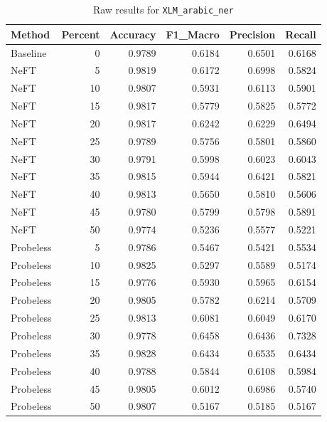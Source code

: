 \documentclass[12pt]{article}
\begin{document}
\begin{table}[H]
\centering
\caption{Raw results for \texttt{XLM\_arabic\_ner}}
\label{tab:xlm-arabic-ner}
\begin{tabular}{lrrrrr}
\toprule
Method & Percent & Accuracy & F1\_Macro & Precision & Recall \\
\midrule
Baseline & 0 & 0.9789 & 0.6184 & 0.6501 & 0.6168 \\
NeFT & 5 & 0.9819 & 0.6172 & 0.6998 & 0.5824 \\
NeFT & 10 & 0.9807 & 0.5931 & 0.6113 & 0.5901 \\
NeFT & 15 & 0.9817 & 0.5779 & 0.5825 & 0.5772 \\
NeFT & 20 & 0.9817 & 0.6242 & 0.6229 & 0.6494 \\
NeFT & 25 & 0.9789 & 0.5756 & 0.5801 & 0.5860 \\
NeFT & 30 & 0.9791 & 0.5998 & 0.6023 & 0.6043 \\
NeFT & 35 & 0.9815 & 0.5944 & 0.6421 & 0.5821 \\
NeFT & 40 & 0.9813 & 0.5650 & 0.5810 & 0.5606 \\
NeFT & 45 & 0.9780 & 0.5799 & 0.5798 & 0.5891 \\
NeFT & 50 & 0.9774 & 0.5236 & 0.5577 & 0.5221 \\
Probeless & 5 & 0.9786 & 0.5467 & 0.5421 & 0.5534 \\
Probeless & 10 & 0.9825 & 0.5297 & 0.5589 & 0.5174 \\
Probeless & 15 & 0.9776 & 0.5930 & 0.5965 & 0.6154 \\
Probeless & 20 & 0.9805 & 0.5782 & 0.6214 & 0.5709 \\
Probeless & 25 & 0.9813 & 0.6081 & 0.6049 & 0.6170 \\
Probeless & 30 & 0.9778 & 0.6458 & 0.6436 & 0.7328 \\
Probeless & 35 & 0.9828 & 0.6434 & 0.6535 & 0.6434 \\
Probeless & 40 & 0.9788 & 0.5844 & 0.6108 & 0.5984 \\
Probeless & 45 & 0.9805 & 0.6012 & 0.6986 & 0.5740 \\
Probeless & 50 & 0.9807 & 0.5167 & 0.5185 & 0.5167 \\
\bottomrule
\end{tabular}
\end{table}
\end{document}
